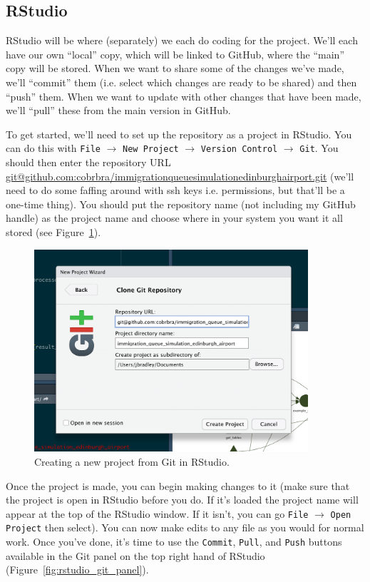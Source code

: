\documentclass[12pt]{article}
\begin{document}
\subsection{RStudio}
RStudio will be where (separately) we each do coding for the project. We'll each have our own ``local'' copy, which will be linked to GitHub, where the ``main'' copy will be stored. When we want to share some of the changes we've made, we'll ``commit'' them (i.e. select which changes are ready to be shared) and then ``push'' them. When we want to update with other changes that have been made, we'll ``pull'' these from the main version in GitHub. 

To get started, we'll need to set up the repository as a project in RStudio. You can do this with \texttt{File} $\rightarrow$ \texttt{New Project} $\rightarrow$ \texttt{Version Control} $\rightarrow$ \texttt{Git}. You should then enter the repository URL \href{git@github.com:cobrbra/immigration_queue_simulation_edinburgh_airport.git}{git@github.com:cobrbra/immigration\textunderscore queue\textunderscore simulation\textunderscore edinburgh\textunderscore airport.git} (we'll need to do some faffing around with ssh keys i.e. permissions, but that'll be a one-time thing). You should put the repository name (not including my GitHub handle) as the project name and choose where in your system you want it all stored (see Figure~\ref{fig:rstudio_new_project}). 

\begin{figure}[htbp]
    \centering
    \includegraphics[width=4in]{figures/rstudio_new_project.png}
    \caption{Creating a new project from Git in RStudio.}
    \label{fig:rstudio_new_project}
\end{figure}

Once the project is made, you can begin making changes to it (make sure that the project is open in RStudio before you do. If it's loaded the project name will appear at the top of the RStudio window. If it isn't, you can go \texttt{File} $\rightarrow$ \texttt{Open Project} then select). You can now make edits to any file as you would for normal work. Once you've done, it's time to use the \texttt{Commit}, \texttt{Pull}, and \texttt{Push} buttons available in the Git panel on the top right hand of RStudio (Figure~\ref{fig:rstudio_git_panel}).
\end{document}
